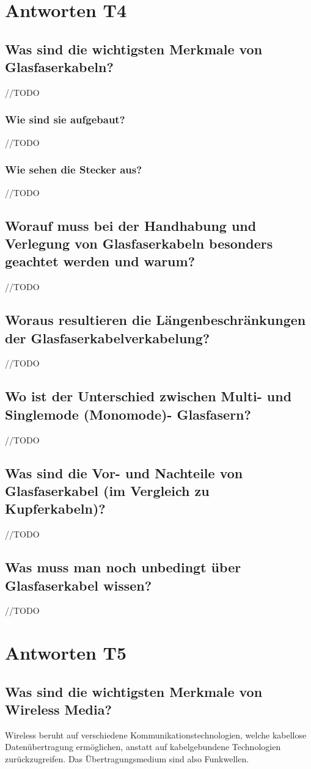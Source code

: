 \section{Antworten T4}
\subsection*{Was sind die wichtigsten Merkmale von Glasfaserkabeln?}
//TODO
\subsubsection*{Wie sind sie aufgebaut?}
//TODO
\subsubsection*{Wie sehen die Stecker aus?}
//TODO
\subsection*{Worauf muss bei der Handhabung und Verlegung von Glasfaserkabeln besonders geachtet werden und warum?}
//TODO
\subsection*{Woraus resultieren die Längenbeschränkungen der Glasfaserkabelverkabelung?}
//TODO
\subsection*{Wo ist der Unterschied zwischen Multi- und Singlemode (Monomode)- Glasfasern?}
//TODO
\subsection*{Was sind die Vor- und Nachteile von Glasfaserkabel (im Vergleich zu Kupferkabeln)?}
//TODO
\subsection*{Was muss man noch unbedingt über Glasfaserkabel wissen?}
//TODO

\section{Antworten T5}
\subsection*{Was sind die wichtigsten Merkmale von \flqq{}Wireless Media\frqq?}
Wireless beruht auf verschiedene Kommunikationstechnologien, welche kabellose Datenübertragung ermöglichen, anstatt auf kabelgebundene Technologien zurückzugreifen. Das Übertragungsmedium sind also Funkwellen.

